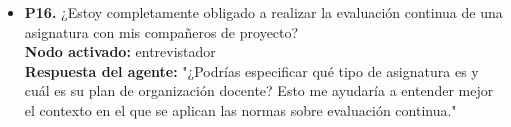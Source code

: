 \documentclass{article}
\begin{document}
\begin{itemize}
            Es importante tener en cuenta que la normativa puede variar dependiendo de las circunstancias específicas de tu caso. Es recomendable consultar con el centro educativo o con un representante del mismo para obtener información más detallada y precisa sobre los procedimientos y consecuencias de anular tu matrícula.

      \item \textbf{P16.} ¿Estoy completamente obligado a realizar la evaluación continua de una asignatura con mis compañeros de proyecto? \\
            \textbf{Nodo activado:} entrevistador \\
            \textbf{Respuesta del agente:} "¿Podrías especificar qué tipo de asignatura es y cuál es su plan de organización docente? Esto me ayudaría a entender mejor el contexto en el que se aplican las normas sobre evaluación continua."

\end{itemize}
\end{document}
